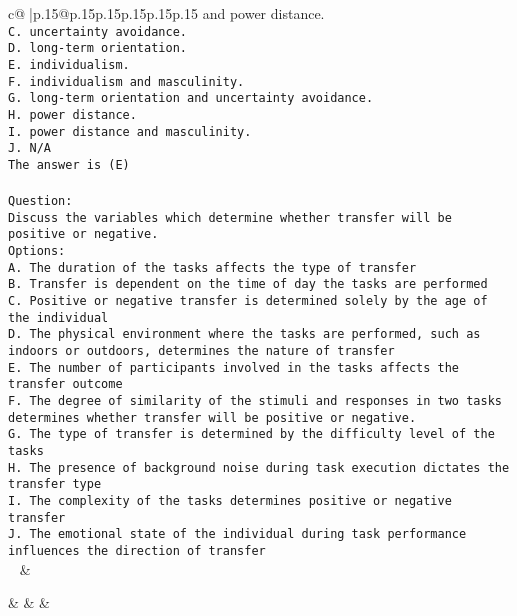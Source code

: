 \documentclass{article}
\begin{document}
{\begin{supertabular}{c@{$\;$}|p{.15\linewidth}@{}p{.15\linewidth}p{.15\linewidth}p{.15\linewidth}p{.15\linewidth}p{.15\linewidth}}
{{{and power distance.\\ \tt C. uncertainty avoidance.\\ \tt D. long-term orientation.\\ \tt E. individualism.\\ \tt F. individualism and masculinity.\\ \tt G. long-term orientation and uncertainty avoidance.\\ \tt H. power distance.\\ \tt I. power distance and masculinity.\\ \tt J. N/A\\ \tt The answer is (E)\\ \tt \\ \tt Question:\\ \tt Discuss the variables which determine whether transfer will be positive or negative.\\ \tt Options:\\ \tt A. The duration of the tasks affects the type of transfer\\ \tt B. Transfer is dependent on the time of day the tasks are performed\\ \tt C. Positive or negative transfer is determined solely by the age of the individual\\ \tt D. The physical environment where the tasks are performed, such as indoors or outdoors, determines the nature of transfer\\ \tt E. The number of participants involved in the tasks affects the transfer outcome\\ \tt F. The degree of similarity of the stimuli and responses in two tasks determines whether transfer will be positive or negative.\\ \tt G. The type of transfer is determined by the difficulty level of the tasks\\ \tt H. The presence of background noise during task execution dictates the transfer type\\ \tt I. The complexity of the tasks determines positive or negative transfer\\ \tt J. The emotional state of the individual during task performance influences the direction of transfer\\ \tt  
	  } 
	   } 
	   } 
	 & \\ 
 

    \theutterance {}  

    &  
	 & & \\ 
 


\end{supertabular}}
\end{document}
